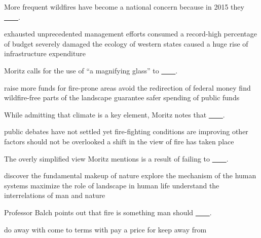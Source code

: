 \item More frequent wildfires have become a national concern because in 2015 they \uline{~~~~}.
\begin{tasks}
	\task exhausted unprecedented management efforts
	\task consumed a record-high percentage of budget
	\task severely damaged the ecology of western states
	\task caused a huge rise of infrastructure expenditure
\end{tasks}
\item Moritz calls for the use of ``a magnifying glass'' to \uline{~~~~}.
\begin{tasks}
	\task raise more funds for fire-prone areas
	\task avoid the redirection of federal money
	\task find wildfire-free parts of the landscape
	\task guarantee safer spending of public funds
\end{tasks}
\item While admitting that climate is a key element, Moritz notes that \uline{~~~~}.
\begin{tasks}
	\task public debates have not settled yet
	\task fire-fighting conditions are improving
	\task other factors should not be overlooked
	\task a shift in the view of fire has taken place
\end{tasks}
\item The overly simplified view Moritz mentions is a result of failing to \uline{~~~~}.
\begin{tasks}
	\task discover the fundamental makeup of nature
	\task explore the mechanism of the human systems
	\task maximize the role of landscape in human life
	\task understand the interrelations of man and nature
\end{tasks}
\item Professor Balch points out that fire is something man should \uline{~~~~}.
\begin{tasks}
	\task do away with
	\task come to terms with
	\task pay a price for
	\task keep away from
\end{tasks}